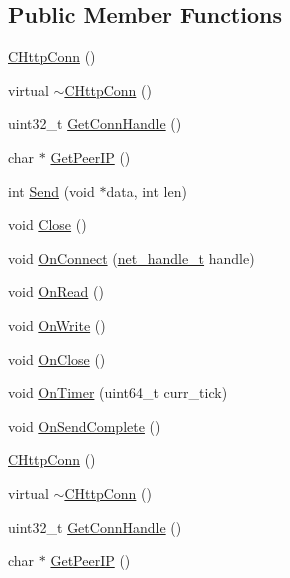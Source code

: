 \subsection*{Public Member Functions}
\begin{DoxyCompactItemize}
\item 
\hyperlink{class_c_http_conn_a8b4eb7a9a17014dbcc3395c1c2c3ddeb}{C\+Http\+Conn} ()
\item 
virtual \hyperlink{class_c_http_conn_ada432083ec16cffa3c07c9322a0c3e10}{$\sim$\+C\+Http\+Conn} ()
\item 
uint32\+\_\+t \hyperlink{class_c_http_conn_a4d4524311aa0cddadaacd8d1757fd9e7}{Get\+Conn\+Handle} ()
\item 
char $\ast$ \hyperlink{class_c_http_conn_ae3e27507d3262f10dcf4fccee79d2541}{Get\+Peer\+I\+P} ()
\item 
int \hyperlink{class_c_http_conn_ab205a0ff06d6d0a629b9c23760bf0177}{Send} (void $\ast$data, int len)
\item 
void \hyperlink{class_c_http_conn_a6e100e44d55155584384ed0fb8e91903}{Close} ()
\item 
void \hyperlink{class_c_http_conn_a1cac21a83a16edc06a8fea0bccc212de}{On\+Connect} (\hyperlink{base_2ostype_8h_a5e1697fa312aa00ac7305460abf166fd}{net\+\_\+handle\+\_\+t} handle)
\item 
void \hyperlink{class_c_http_conn_a1d53fa2c5ef56337b305c036a526b248}{On\+Read} ()
\item 
void \hyperlink{class_c_http_conn_a5472986aa83ff3ee4278b44d4fa107d3}{On\+Write} ()
\item 
void \hyperlink{class_c_http_conn_a41bfb10253014f84ddb95a15485339e3}{On\+Close} ()
\item 
void \hyperlink{class_c_http_conn_ae12aba0480560dbb9c1c59cada86dec7}{On\+Timer} (uint64\+\_\+t curr\+\_\+tick)
\item 
void \hyperlink{class_c_http_conn_a252f22137666ecc593a7b2822235d78c}{On\+Send\+Complete} ()
\item 
\hyperlink{class_c_http_conn_a8b4eb7a9a17014dbcc3395c1c2c3ddeb}{C\+Http\+Conn} ()
\item 
virtual \hyperlink{class_c_http_conn_a0cd6f177a4d6f42d725126c9fd5a61d5}{$\sim$\+C\+Http\+Conn} ()
\item 
uint32\+\_\+t \hyperlink{class_c_http_conn_a4d4524311aa0cddadaacd8d1757fd9e7}{Get\+Conn\+Handle} ()
\item 
char $\ast$ \hyperlink{class_c_http_conn_ae3e27507d3262f10dcf4fccee79d2541}{Get\+Peer\+I\+P} ()
\item 

\end{DoxyCompactItemize}
